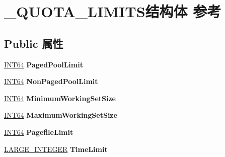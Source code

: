 \hypertarget{struct___q_u_o_t_a___l_i_m_i_t_s}{}\section{\+\_\+\+Q\+U\+O\+T\+A\+\_\+\+L\+I\+M\+I\+T\+S结构体 参考}
\label{struct___q_u_o_t_a___l_i_m_i_t_s}
\subsection*{Public 属性}
\begin{DoxyCompactItemize}
\item 
\mbox{\label{struct___q_u_o_t_a___l_i_m_i_t_s_ae23bf046fd142553db5aa44fae28f26f}} 
\hyperlink{_processor_bind_8h_af16992cf571ce4103a92355761cc471e}{I\+N\+T64} {\bfseries Paged\+Pool\+Limit}
\item 
\mbox{\label{struct___q_u_o_t_a___l_i_m_i_t_s_a8bf39a6fc2d7949ca2199f4706ab6613}} 
\hyperlink{_processor_bind_8h_af16992cf571ce4103a92355761cc471e}{I\+N\+T64} {\bfseries Non\+Paged\+Pool\+Limit}
\item 
\mbox{\label{struct___q_u_o_t_a___l_i_m_i_t_s_abb1589cd3905fbc5b666deea1494f19b}} 
\hyperlink{_processor_bind_8h_af16992cf571ce4103a92355761cc471e}{I\+N\+T64} {\bfseries Minimum\+Working\+Set\+Size}
\item 
\mbox{\label{struct___q_u_o_t_a___l_i_m_i_t_s_a066a54f5de6ccd0c2b92a08f278cc56e}} 
\hyperlink{_processor_bind_8h_af16992cf571ce4103a92355761cc471e}{I\+N\+T64} {\bfseries Maximum\+Working\+Set\+Size}
\item 
\mbox{\label{struct___q_u_o_t_a___l_i_m_i_t_s_adc188aee1671a0a36541e9e15dbfcfb9}} 
\hyperlink{_processor_bind_8h_af16992cf571ce4103a92355761cc471e}{I\+N\+T64} {\bfseries Pagefile\+Limit}
\item 
\mbox{\label{struct___q_u_o_t_a___l_i_m_i_t_s_a967da0a82253235e153552aa93b9cdad}} 
\hyperlink{union___l_a_r_g_e___i_n_t_e_g_e_r}{L\+A\+R\+G\+E\+\_\+\+I\+N\+T\+E\+G\+ER} {\bfseries Time\+Limit}
\item 

\end{DoxyCompactItemize}
